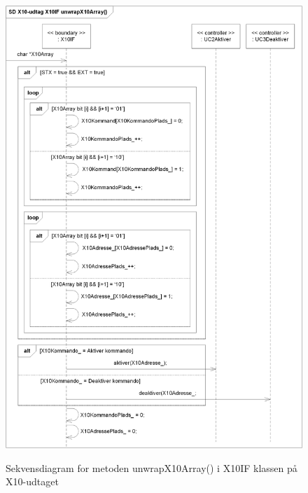 \begin{figure}[!htb]
     {\includegraphics[width=\textwidth]{billeder/uml/X10-Udtag_unwrapX10Array_SD}}
     \caption{Sekvensdiagram for metoden unwrapX10Array() i X10IF klassen på X10-udtaget}
     \label{fig:X10_udtag_unwrapX10Array_SD}
\end{figure}


